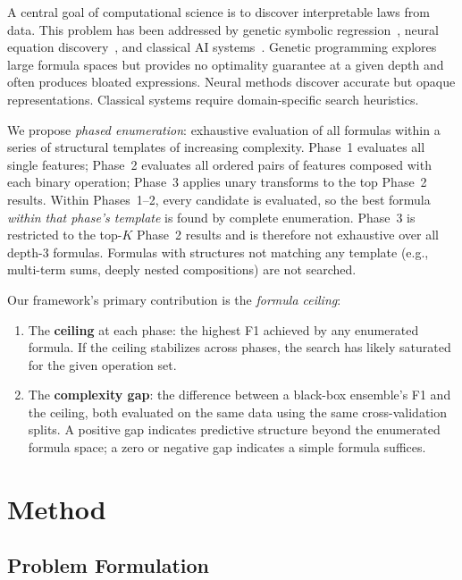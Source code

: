 \documentclass[journal]{IEEEtran}
\begin{document}
A central goal of computational science is to discover interpretable
laws from data. This problem has been addressed by genetic symbolic
regression~\cite{schmidt2009distilling, cranmer2023interpretable},
neural equation discovery~\cite{udrescu2020ai}, and classical AI
systems~\cite{langley1987scientific}. Genetic programming explores
large formula spaces but provides no optimality guarantee at a given
depth and often produces bloated expressions. Neural methods discover
accurate but opaque representations. Classical systems require
domain-specific search heuristics.

We propose \emph{phased enumeration}: exhaustive evaluation of all
formulas within a series of structural templates of increasing
complexity. Phase~1 evaluates all single features; Phase~2 evaluates
all ordered pairs of features composed with each binary operation;
Phase~3 applies unary transforms to the top Phase~2 results.
Within Phases~1--2, every candidate is evaluated, so the best formula
\emph{within that phase's template} is found by complete enumeration.
Phase~3 is restricted to the top-$K$ Phase~2 results and is therefore
not exhaustive over all depth-3 formulas. Formulas with structures
not matching any template (e.g., multi-term sums, deeply nested
compositions) are not searched.

Our framework's primary contribution is the \emph{formula ceiling}:
\begin{enumerate}
\item The \textbf{ceiling} at each phase: the highest F1 achieved by
any enumerated formula. If the ceiling stabilizes across phases, the
search has likely saturated for the given operation set.
\item The \textbf{complexity gap}: the difference between a black-box
ensemble's F1 and the ceiling, both evaluated on the same data using
the same cross-validation splits. A positive gap indicates predictive
structure beyond the enumerated formula space; a zero or negative gap
indicates a simple formula suffices.
\end{enumerate}

\section{Method}

\subsection{Problem Formulation}
\end{document}
